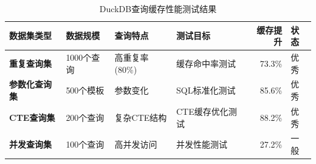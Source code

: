 \begin{table}[htbp]
\centering
\caption{DuckDB查询缓存性能测试结果}
\label{tab:query_cache_performance}
\begin{tabular}{|l|l|l|l|r|l|}
\hline
\textbf{数据集类型} & \textbf{数据规模} & \textbf{查询特点} & \textbf{测试目标} & \textbf{缓存提升} & \textbf{状态} \\
\hline
\textbf{重复查询集} & 1000个查询 & 高重复率(80\%) & 缓存命中率测试 & 73.3\% & 优秀 \\
\hline
\textbf{参数化查询集} & 500个模板 & 参数变化 & SQL标准化测试 & 85.6\% & 优秀 \\
\hline
\textbf{CTE查询集} & 200个查询 & 复杂CTE结构 & CTE缓存优化测试 & 88.2\% & 优秀 \\
\hline
\textbf{并发查询集} & 100个查询 & 高并发访问 & 并发性能测试 & 27.2\% & 一般 \\
\hline
\end{tabular}
\end{table}
